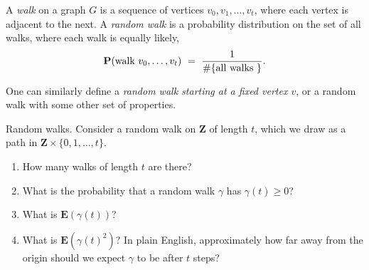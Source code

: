 \documentclass[11pt,fleqn]{book} %
\begin{document}
\begin{definition}
    A \emph{walk} on a graph $G$ is a sequence of vertices $v_0,v_1, \ldots ,v_t$, where each vertex is adjacent to the next. A \emph{random walk} is a probability distribution on the set of all walks, where each walk is equally likely, 
    $$\mathbf{P}(\textup{walk }v_0, \ldots ,v_t) \ = \ \frac{1}{\#\{\textup{all walks }\}}.$$
\end{definition}

One can similarly define a \textit{random walk starting at a fixed vertex $v$}, or a random walk with some other set of properties.


\begin{problem}
  Random walks. Consider a random walk on $\mathbf{Z}$ of length $t$, which we draw as a path in $\mathbf{Z}\times \{0,1, \ldots ,t\}$.
  \begin{center}
   \end{center}
\begin{enumerate}[label=\alph*.]
 \item How many walks of length $t$ are there? 
 \item What is the probability that a random walk $\gamma$ has $\gamma(t) \ge 0$?
 \item What is $\mathbf{E}(\gamma(t))$?
 \item What is $\mathbf{E}(\gamma(t)^2)$? In plain English, approximately how far away from the origin should we expect $\gamma$ to be after $t$ steps?
\end{enumerate}
\end{problem}
\end{document}

